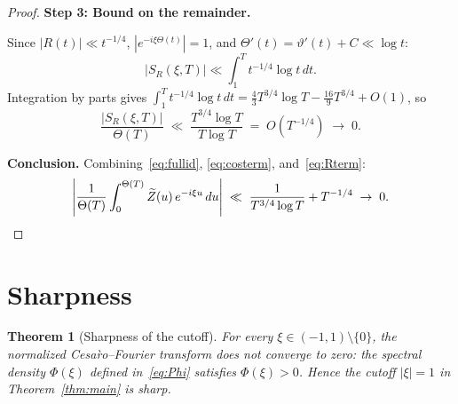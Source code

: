 \documentclass[12pt]{amsart}
\newtheorem{theorem}{Theorem}[section]
\theoremstyle{definition}
\theoremstyle{remark}
\newcommand{\Th}{\Theta}
\newcommand{\vth}{\vartheta}
\newcommand{\Zt}{\widetilde{Z}}
\begin{document}
\begin{proof}
\medskip
\noindent\textbf{Step 3: Bound on the remainder.}

Since $|R(t)|\ll t^{-1/4}$, $|e^{-i\xi\Th(t)}|=1$, and
$\Th'(t)=\vth'(t)+C\ll\log t$:
\[
  |S_R(\xi,T)| \ll \int_1^T t^{-1/4}\log t\,dt.
\]
Integration by parts gives
$\int_1^T t^{-1/4}\log t\,dt
=\tfrac{4}{3}T^{3/4}\log T-\tfrac{16}{9}T^{3/4}+O(1)$,
so
\begin{equation}\label{eq:Rterm}
  \frac{|S_R(\xi,T)|}{\Th(T)}
  \;\ll\; \frac{T^{3/4}\log T}{T\log T}
  \;=\; O(T^{-1/4})
  \;\to\; 0.
\end{equation}

\medskip
\noindent\textbf{Conclusion.}
Combining~\eqref{eq:fullid}, \eqref{eq:costerm}, and~\eqref{eq:Rterm}:
\[
  \left|\frac{1}{\Th(T)}\int_0^{\Th(T)}\Zt(u)\,e^{-i\xi u}\,du\right|
  \;\ll\; \frac{1}{T^{3/4}\log T} + T^{-1/4}
  \;\to\; 0. \qedhere
\]
\end{proof}

\section{Sharpness}\label{sec:sharp}

\begin{theorem}[Sharpness of the cutoff]\label{thm:sharp}
For every $\xi\in(-1,1)\setminus\{0\}$, the normalized Cesa\`{r}o--Fourier
transform does \emph{not} converge to zero: the spectral density
$\Phi(\xi)$ defined in~\eqref{eq:Phi} satisfies $\Phi(\xi)>0$.
Hence the cutoff $|\xi|=1$ in Theorem~\ref{thm:main} is sharp.
\end{theorem}
\end{document}
